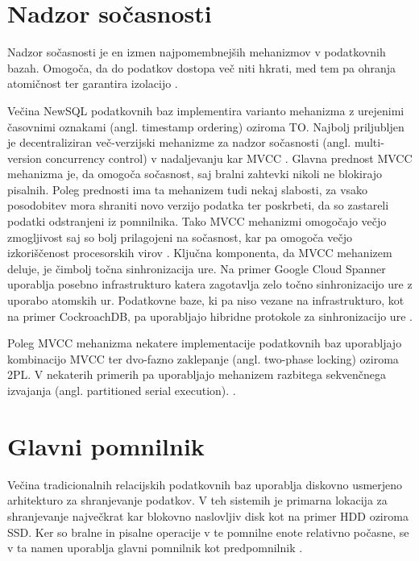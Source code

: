 \documentclass[a4paper, 12pt]{book}
\begin{document}
\section{Nadzor sočasnosti}
Nadzor sočasnosti je en izmen najpomembnejših mehanizmov v podatkovnih bazah. Omogoča, da do podatkov dostopa več niti hkrati, med tem pa ohranja atomičnost ter garantira izolacijo \cite{Pavlo2016Sep}.

Večina NewSQL podatkovnih baz implementira varianto mehanizma z urejenimi časovnimi oznakami (angl. timestamp ordering) oziroma TO. Najbolj priljubljen je decentraliziran več-verzijski mehanizme za nadzor so\-čas\-no\-sti (angl. multi-version concurrency control) v nadaljevanju kar MVCC \cite{Pavlo2016Sep}.
Glavna prednost MVCC mehanizma je, da omogoča sočasnost, saj bralni zahtevki nikoli ne blokirajo pisalnih. Poleg prednosti ima ta mehanizem tudi nekaj slabosti, za vsako posodobitev mora shraniti novo verzijo podatka ter poskrbeti, da so zastareli podatki odstranjeni iz pomnilnika. Tako MVCC mehanizmi omogočajo večjo zmogljivost saj so bolj prilagojeni na sočasnost, kar pa omogoča večjo izkoriščenost procesorskih virov \cite{MainMemoryDatabaseSystems}. Ključna komponenta, da MVCC mehanizem deluje, je čimbolj točna sinhronizacija ure. Na primer Google Cloud Spanner uporablja posebno infrastrukturo katera zagotavlja zelo točno sinhronizacijo ure z uporabo atomskih ur. Podatkovne baze, ki pa niso vezane na infrastrukturo, kot na primer CockroachDB, pa uporabljajo hibridne protokole za sinhronizacijo ure \cite{Pavlo2016Sep}.

Poleg MVCC mehanizma nekatere implementacije podatkovnih baz uporabljajo kombinacijo MVCC ter dvo-fazno zaklepanje (angl. two-phase locking) oziroma 2PL. V nekaterih primerih pa uporabljajo mehanizem razbitega sekvenčnega izvajanja (angl. partitioned serial
execution). \cite{Pavlo2016Sep, MainMemoryDatabaseSystems}.

\section{Glavni pomnilnik}

Večina tradicionalnih relacijskih podatkovnih baz uporablja diskovno usmerjeno arhitekturo za shranjevanje podatkov. V teh sistemih je primarna lokacija za shranjevanje največkrat kar blokovno naslovljiv disk kot na primer HDD oziroma SSD. Ker so bralne in pisalne operacije v te pomnilne enote relativno počasne, se v ta namen uporablja glavni pomnilnik kot predpomnilnik \cite{Pavlo2016Sep}.
\end{document}
